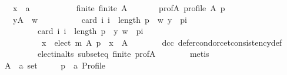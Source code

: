 \begin{isabellebody}
\ \ \ \ \ \ x\ {\isacharcolon}{\kern0pt}{\isacharcolon}{\kern0pt}\ {\isachardoublequoteopen}{\isacharprime}{\kern0pt}a{\isachardoublequoteclose}\isanewline
\ \ \ \ \isamarkupfalse%
\isanewline
\ \ \ \ \ \ finite{\isacharcolon}{\kern0pt}\ {\isachardoublequoteopen}finite\ A{\isachardoublequoteclose}\ \isanewline
\ \ \ \ \ \ prof{\isacharunderscore}{\kern0pt}A{\isacharcolon}{\kern0pt}\ {\isachardoublequoteopen}profile\ A\ p{\isachardoublequoteclose}\isanewline
\ \ \ \ \isamarkupfalse%
\isanewline
\ \ \ \ \ \ {\isachardoublequoteopen}{\isasymforall}y{\isasymin}A\ {\isacharminus}{\kern0pt}\ {\isacharbraceleft}{\kern0pt}w{\isacharbraceright}{\kern0pt}{\isachardot}{\kern0pt}\isanewline
\ \ \ \ \ \ \ \ \ \ card\ {\isacharbraceleft}{\kern0pt}i{\isachardot}{\kern0pt}\ i\ {\isacharless}{\kern0pt}\ length\ p\ {\isasymand}\ {\isacharparenleft}{\kern0pt}w{\isacharcomma}{\kern0pt}\ y{\isacharparenright}{\kern0pt}\ {\isasymin}\ {\isacharparenleft}{\kern0pt}p{\isacharbang}{\kern0pt}i{\isacharparenright}{\kern0pt}{\isacharbraceright}{\kern0pt}\ {\isacharless}{\kern0pt}\isanewline
\ \ \ \ \ \ \ \ \ \ \ \ card\ {\isacharbraceleft}{\kern0pt}i{\isachardot}{\kern0pt}\ i\ {\isacharless}{\kern0pt}\ length\ p\ {\isasymand}\ {\isacharparenleft}{\kern0pt}y{\isacharcomma}{\kern0pt}\ w{\isacharparenright}{\kern0pt}\ {\isasymin}\ {\isacharparenleft}{\kern0pt}p{\isacharbang}{\kern0pt}i{\isacharparenright}{\kern0pt}{\isacharbraceright}{\kern0pt}\ {\isasymLongrightarrow}\isanewline
\ \ \ \ \ \ \ \ \ \ \ \ \ x\ {\isasymin}\ elect\ m\ A\ p\ {\isasymLongrightarrow}\ x\ {\isasymin}\ A{\isachardoublequoteclose}\isanewline
\ \ \ \ \ \ \isamarkupfalse%
\ dcc\ defer{\isacharunderscore}{\kern0pt}condorcet{\isacharunderscore}{\kern0pt}consistency{\isacharunderscore}{\kern0pt}def\isanewline
\ \ \ \ \ \ \ \ \ \ \ \ elect{\isacharunderscore}{\kern0pt}in{\isacharunderscore}{\kern0pt}alts\ subset{\isacharunderscore}{\kern0pt}eq\ finite\ prof{\isacharunderscore}{\kern0pt}A\isanewline
\ \ \ \ \ \ \isamarkupfalse%
\ metis\isanewline
\ \ \isamarkupfalse%
\isanewline
{}\isamarkupfalse%
\isanewline
\ \ \isamarkupfalse%
\isanewline
\ \ \ \ A\ {\isacharcolon}{\kern0pt}{\isacharcolon}{\kern0pt}\ {\isachardoublequoteopen}{\isacharprime}{\kern0pt}a\ set{\isachardoublequoteclose}\ \isanewline
\ \ \ \ p\ {\isacharcolon}{\kern0pt}{\isacharcolon}{\kern0pt}\ {\isachardoublequoteopen}{\isacharprime}{\kern0pt}a\ Profile{\isachardoublequoteclose}\ \isanewline

\end{isabellebody}
